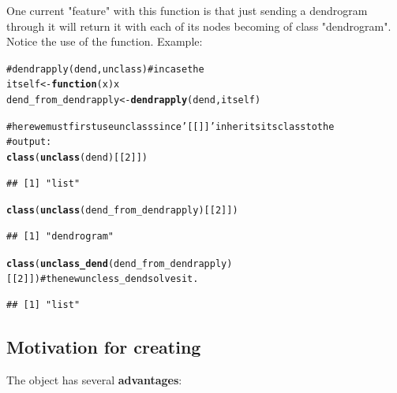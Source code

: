 \documentclass[shortnames,nojss,article]{jss}\usepackage{graphicx, color}
\makeatletter
\newcommand{\hlfunctioncall}[1]{\textcolor[rgb]{0.501960784313725,0,0.329411764705882}{\textbf{#1}}}%
\newcommand{\hlcomment}[1]{\textcolor[rgb]{0.180392156862745,0.6,0.341176470588235}{#1}}%
\newenvironment{kframe}{%
 \def\at@end@of@kframe{}%
 \ifinner\ifhmode%
  \def\at@end@of@kframe{\end{minipage}}%
  \begin{minipage}{\columnwidth}%
 \fi\fi%
 \def\FrameCommand##1{\hskip\@totalleftmargin \hskip-\fboxsep
 \colorbox{shadecolor}{##1}\hskip-\fboxsep
     \hskip-\linewidth \hskip-\@totalleftmargin \hskip\columnwidth}%
 \MakeFramed {\advance\hsize-\width
   \@totalleftmargin\z@ \linewidth\hsize
   \@setminipage}}%
 {\par\unskip\endMakeFramed%
 \at@end@of@kframe}
\newenvironment{knitrout}{}{} %
\makeatother
\begin{document}
One current "feature" with this function is that just sending a dendrogram through it will return it with each of its nodes becoming of class "dendrogram". Notice the use of the  function. Example:

\begin{knitrout}
\color{fgcolor}\begin{kframe}
\begin{alltt}
\hlcomment{# dendrapply(dend, unclass) # in case the}
itself <- \hlfunctioncall{function}(x) x
dend_from_dendrapply <- \hlfunctioncall{dendrapply}(dend, itself)

\hlcomment{# here we must first use unclass since '[[]]' inherits its class to the}
\hlcomment{# output:}
\hlfunctioncall{class}(\hlfunctioncall{unclass}(dend)[[2]])
\end{alltt}
\begin{verbatim}
## [1] "list"
\end{verbatim}
\begin{alltt}
\hlfunctioncall{class}(\hlfunctioncall{unclass}(dend_from_dendrapply)[[2]])
\end{alltt}
\begin{verbatim}
## [1] "dendrogram"
\end{verbatim}
\begin{alltt}
\hlfunctioncall{class}(\hlfunctioncall{unclass_dend}(dend_from_dendrapply)[[2]])  \hlcomment{# the new uncless_dend solves it.}
\end{alltt}
\begin{verbatim}
## [1] "list"
\end{verbatim}
\end{kframe}
\end{knitrout}




\subsection{Motivation for creating }



The  object has several \textbf{advantages}:
\end{document}
